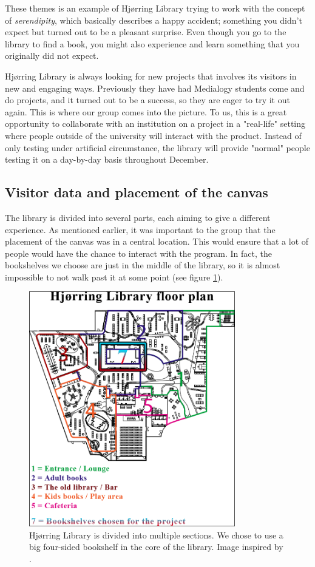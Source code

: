 These themes is an example of Hj{\o}rring Library trying to work with the concept of \textit{serendipity}, which basically describes a happy accident; something you didn't expect but turned out to be a pleasant surprise. Even though you go to the library to find a book, you might also experience and learn something that you originally did not expect.

Hj{\o}rring Library is always looking for new projects that involves its visitors in new and engaging ways. Previously they have had Medialogy students come and do projects, and it turned out to be a success, so they are eager to try it out again. This is where our group comes into the picture. To us, this is a great opportunity to collaborate with an institution on a project in a "real-life" setting where people outside of the university will interact with the product. Instead of only testing under artificial circumstance, the library will provide "normal" people testing it on a day-by-day basis throughout December.

\subsection{Visitor data and placement of the canvas}
The library is divided into several parts, each aiming to give a different experience. As mentioned earlier, it was important to the group that the placement of the canvas was in a central location. This would ensure that a lot of people would have the chance to interact with the program. In fact, the bookshelves we choose are just in the middle of the library, so it is almost impossible to not walk past it at some point (see figure \ref{fig:library_floorplans}).

\begin{figure}[htbp]
\centering
\includegraphics[width=0.80\textwidth]{Pictures/HjoerringLibrary/hjoerring_library_floorplans.png}
\caption{Hj{\o}rring Library is divided into multiple sections. We chose to use a big four-sided bookshelf in the core of the library. Image inspired by \citep{hjoerring_study}.}
\label{fig:library_floorplans}
\end{figure}

